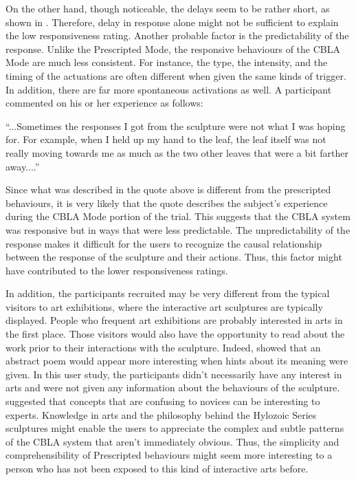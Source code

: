 On the other hand, though noticeable, the delays seem to be rather short, as shown in . Therefore, delay in response alone might not be sufficient to explain the low responsiveness rating. Another probable factor is the predictability of the response. Unlike the Prescripted Mode, the responsive behaviours of the CBLA Mode are much less consistent. For instance, the type, the intensity, and the timing of the actuations are often different when given the same kinds of trigger. In addition, there are far more spontaneous activations as well. A participant commented on his or her experience as follows: 
\begin{blockquote}
	``...Sometimes the responses I got from the sculpture were not what I was hoping for. For example, when I held up my hand to the leaf, the leaf itself was not really moving towards me as much as the two other leaves that were a bit farther away....''
\end{blockquote}
Since what was described in the quote above is different from the prescripted behaviours, it is very likely that the quote describes the subject's experience during the CBLA Mode portion of the trial. This suggests that the CBLA system was responsive but in ways that were less predictable. 
The unpredictability of the response makes it difficult for the users to recognize the causal relationship between the response of the sculpture and their actions. Thus, this factor might have contributed to the lower responsiveness ratings.
	 
In addition, the participants recruited may be very different from the typical visitors to art exhibitions, where the interactive art sculptures are typically displayed. People who frequent art exhibitions are probably interested in arts in the first place. Those visitors would also have the opportunity to read about the work prior to their interactions with the sculpture. Indeed, \cite{Silvia2005} showed that an abstract poem would appear more interesting when hints about its meaning were given. In this user study, the participants didn't necessarily have any interest in arts and were not given any information about the behaviours of the sculpture. \cite{Silvia2008} suggested that concepts that are confusing to novices can be interesting to experts. Knowledge in arts and the philosophy behind the Hylozoic Series sculptures might enable the users to appreciate the complex and subtle patterns of the CBLA system that aren't immediately obvious. Thus, the simplicity and comprehensibility of Prescripted behaviours might seem more interesting to a person who has not been exposed to this kind of interactive arts before. 

